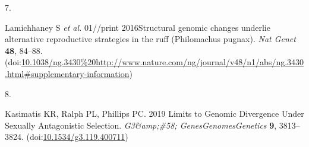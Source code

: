 \documentclass[
  11pt,
]{article}
\newlength{\cslhangindent}
\newlength{\csllabelwidth}
\newlength{\cslentryspacingunit} %
\newenvironment{CSLReferences}[2] %
 {%
  \setlength{\parindent}{0pt}
  \ifodd #1
  \let\oldpar\par
  \def\par{\hangindent=\cslhangindent\oldpar}
  \fi
  \setlength{\parskip}{#2\cslentryspacingunit}
 }%
 {}
\newcommand{\CSLLeftMargin}[1]{\parbox[t]{\csllabelwidth}{#1}}
\newcommand{\CSLRightInline}[1]{\parbox[t]{\linewidth - \csllabelwidth}{#1}\break}
\begin{document}
\begin{CSLReferences}{0}{0}
\leavevmode{}%
\CSLLeftMargin{7. }
\CSLRightInline{Lamichhaney S \emph{et al.} 01//print 2016Structural genomic changes underlie alternative reproductive strategies in the ruff ({Philomachus} pugnax). \emph{Nat Genet} \textbf{48}, 84--88. (doi:\url{10.1038/ng.3430\%20http://www.nature.com/ng/journal/v48/n1/abs/ng.3430.html\#supplementary-information})}

\leavevmode{}%
\CSLLeftMargin{8. }
\CSLRightInline{Kasimatis KR, Ralph PL, Phillips PC. 2019 Limits to {Genomic Divergence Under Sexually Antagonistic Selection}. \emph{G3\&amp;\#58; Genes\textbar Genomes\textbar Genetics} \textbf{9}, 3813--3824. (doi:\href{https://doi.org/10.1534/g3.119.400711}{10.1534/g3.119.400711})}

\end{CSLReferences}
\end{document}
